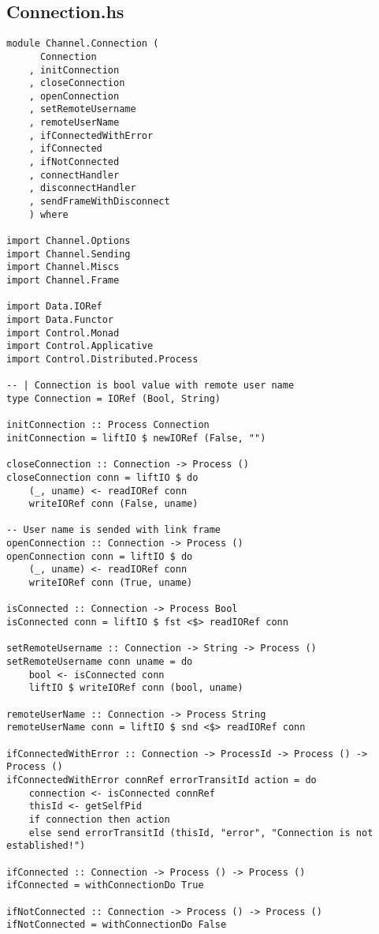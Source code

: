 \documentclass[russian,utf8,simple,emptystyle]{eskdtext}
\begin{document}
\subsection{Connection.hs}
\begin{lstlisting}
module Channel.Connection (
      Connection
    , initConnection
    , closeConnection
    , openConnection
    , setRemoteUsername
    , remoteUserName
    , ifConnectedWithError
    , ifConnected 
    , ifNotConnected
    , connectHandler
    , disconnectHandler
    , sendFrameWithDisconnect
    ) where

import Channel.Options
import Channel.Sending
import Channel.Miscs
import Channel.Frame 

import Data.IORef
import Data.Functor
import Control.Monad
import Control.Applicative
import Control.Distributed.Process

-- | Connection is bool value with remote user name
type Connection = IORef (Bool, String)

initConnection :: Process Connection
initConnection = liftIO $ newIORef (False, "")

closeConnection :: Connection -> Process () 
closeConnection conn = liftIO $ do
    (_, uname) <- readIORef conn 
    writeIORef conn (False, uname)

-- User name is sended with link frame 
openConnection :: Connection -> Process ()
openConnection conn = liftIO $ do 
    (_, uname) <- readIORef conn 
    writeIORef conn (True, uname)

isConnected :: Connection -> Process Bool 
isConnected conn = liftIO $ fst <$> readIORef conn 

setRemoteUsername :: Connection -> String -> Process ()
setRemoteUsername conn uname = do 
    bool <- isConnected conn 
    liftIO $ writeIORef conn (bool, uname)

remoteUserName :: Connection -> Process String
remoteUserName conn = liftIO $ snd <$> readIORef conn 

ifConnectedWithError :: Connection -> ProcessId -> Process () -> Process ()
ifConnectedWithError connRef errorTransitId action = do 
    connection <- isConnected connRef
    thisId <- getSelfPid
    if connection then action
    else send errorTransitId (thisId, "error", "Connection is not established!") 

ifConnected :: Connection -> Process () -> Process ()
ifConnected = withConnectionDo True

ifNotConnected :: Connection -> Process () -> Process ()
ifNotConnected = withConnectionDo False


\end{lstlisting}
\end{document}
